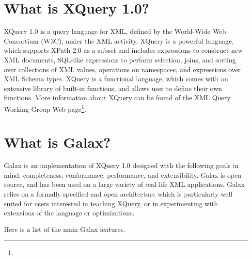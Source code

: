 \section{What is XQuery 1.0?}

XQuery 1.0 is a query language for XML, defined by the World-Wide Web
Consortium (W3C), under the XML activity.  XQuery is a powerful
language, which supports XPath 2.0 as a subset and includes
expressions to construct new XML documents, SQL-like expressions to
perform selection, joins, and sorting over collections of XML values,
operations on namespaces, and expressions over XML Schema types.
XQuery is a functional language, which comes with an extensive library
of built-in functions, and allows user to define their own functions.
More information about XQuery can be found of the XML Query Working
Group Web page\footnote{\xquerywgurl}.

\section{What is Galax?}

Galax is an implementation of XQuery 1.0 designed with the following
goals in mind: completeness, conformance, performance, and
extensibility. Galax is open-source, and has been used on a large
variety of real-life XML applications. Galax relies on a formally
specified and open architecture which is particularly well suited for
users interested in teaching XQuery, or in experimenting with
extensions of the language or optimizations.

Here is a list of the main Galax features.

